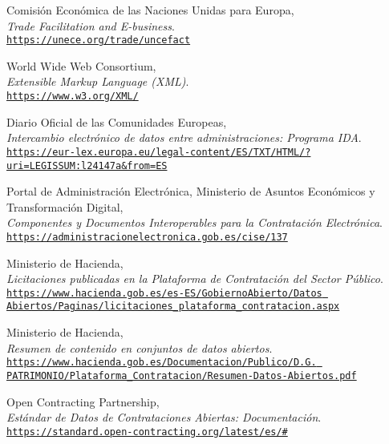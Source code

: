 \begin{thebibliography}{X}
            Comisión Económica de las Naciones Unidas para Europa,
            \\ \textit{Trade Facilitation and E-business}.
            \\ \texttt{\url{https://unece.org/trade/uncefact}}
            
            World Wide Web Consortium,
            \\ \textit{Extensible Markup Language (XML)}.
            \\ \texttt{\url{https://www.w3.org/XML/}}
            
            Diario Oficial de las Comunidades Europeas,
            \\ \textit{Intercambio electrónico de datos entre administraciones: Programa IDA}.
            \\ \texttt{\url{https://eur-lex.europa.eu/legal-content/ES/TXT/HTML/?uri=LEGISSUM:l24147a&from=ES}}
            
            Portal de Administración Electrónica,
            Ministerio de Asuntos Económicos y Transformación Digital,
            \\ \textit{Componentes y Documentos Interoperables para la Contratación Electrónica}.
            \\ \texttt{\url{https://administracionelectronica.gob.es/cise/137}}
            
            Ministerio de Hacienda,
            \\ \textit{Licitaciones publicadas en la Plataforma de Contratación del Sector Público}.
            \\ \texttt{\url{https://www.hacienda.gob.es/es-ES/GobiernoAbierto/Datos Abiertos/Paginas/licitaciones\_plataforma\_contratacion.aspx}}
            
            Ministerio de Hacienda,
            \\ \textit{Resumen de contenido en conjuntos de datos abiertos}.
            \\ \texttt{\url{https://www.hacienda.gob.es/Documentacion/Publico/D.G. PATRIMONIO/Plataforma_Contratacion/Resumen-Datos-Abiertos.pdf}}
            
            Open Contracting Partnership,
            \\ \textit{Estándar de Datos de Contrataciones Abiertas: Documentación}.
            \\ \texttt{\url{https://standard.open-contracting.org/latest/es/\#}}
        

\end{thebibliography}
